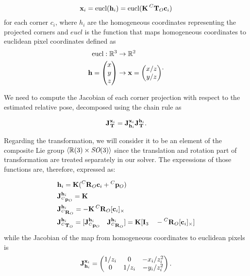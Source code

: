 \begin{equation}
    {\bf x}_i = \text{eucl}({\bf h}_i) = \text{eucl}({\bf K}\prescript{C}{}{{\bf T}}_{O} {\bf c}_i)
\end{equation}
%
for each corner $c_i$, where $h_i$ are the homogeneous coordinates representing the projected corners and $eucl$ is the function that maps 
homogeneous coordinates to euclidean pixel coordinates defined as
%
\begin{equation}
    \begin{split}
        \text{eucl}: \mathbb{R}^3 
        &\rightarrow \mathbb{R}^2 \\
        {\bf h} = \begin{pmatrix}x\\y\\z\end{pmatrix} 
        &\rightarrow {\bf x} = \begin{pmatrix}x/z\\y/z\end{pmatrix}
    \end{split}.
\end{equation}

We need to compute the Jacobian of each corner projection with respect to the estimated relative pose, decomposed using the chain rule as  

\begin{equation}
    {\bf J}^{{\bf x}_i}_{\prescript{}{}{{\bf T}}_{}} = {\bf J}^{{\bf x}_i}_{{\bf h}_i} {\bf J}^{{\bf h}_i}_{\prescript{}{}{{\bf T}}_{}}.   
\end{equation}

Regarding the transformation, we will consider it to be an element of the composite Lie group $\left<\mathbb{R}(3)\times \textit{SO}(3)\right>$ since the translation and rotation part 
of transformation are treated separately in our solver. The expressions of those functions are, therefore, expressed as:

\begin{equation}
    \begin{split}
        &{\bf h}_i = {\bf K}(\prescript{C}{}{{\bf R}}_{O}{\bf c}_i + \prescript{C}{}{{\bf p}}_{O}) \\
        &{\bf J}^{{\bf h}_i}_{\prescript{C}{}{{\bf p}}_{O}} = {\bf K} ~~~~~~ \\ &{\bf J}^{{\bf h}_i}_{\prescript{C}{}{{\bf R}}_{O}} = -{\bf K}\prescript{C}{}{{\bf R}}_{O}[{\bf c}_i]_{\times}  \\  
        &{\bf J}^{{\bf h}_i}_{\prescript{C}{}{{\bf T}}_{O}} = [{\bf J}^{{\bf h}_i}_{\prescript{C}{}{{\bf p}}_{O}} ~~~ {\bf J}^{{\bf h}_i}_{\prescript{C}{}{{\bf R}}_{O}}] = {\bf K} [{\bf I}_3 ~~~ -\prescript{C}{}{{\bf R}}_{O} [{\bf c}_i]_{\times}]
    \end{split}
\end{equation}
%
while the Jacobian of the map from homogeneous coordinates to euclidean pixels is
\begin{equation}
    {\bf J}^{{\bf x}_i}_{{\bf h}_i}
    =
    \begin{pmatrix}
    1/z_i & 0 & -x_i/z_i^2 \\
    0 & 1/z_i & -y_i/z_i^2
    \end{pmatrix}.
\end{equation}

